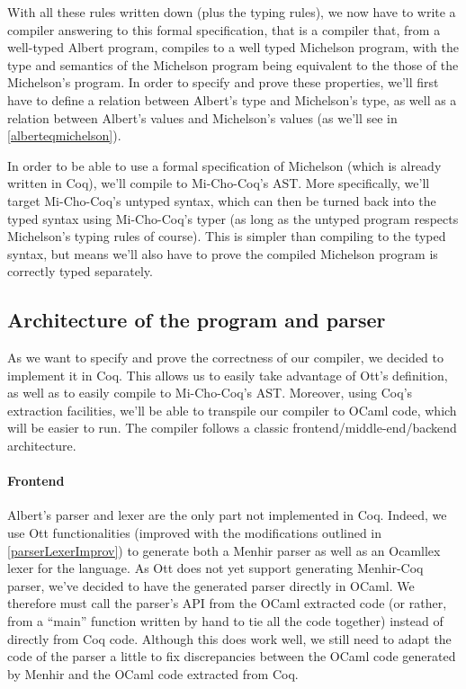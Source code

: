 \documentclass{report}
\begin{document}
With all these rules written down (plus the typing rules), we now have to write a compiler answering to this formal specification, that is a compiler that, from a well-typed Albert program, compiles to a well typed Michelson program, with the type and semantics of the Michelson program being equivalent to the those of the Michelson's program. In order to specify and prove these properties, we'll first have to define a relation between Albert's type and Michelson's type, as well as a relation between Albert's values and Michelson's values (as we'll see in \ref{alberteqmichelson}).

In order to be able to use a formal specification of Michelson (which is already written in Coq), we'll compile to Mi-Cho-Coq's AST. More specifically, we'll target Mi-Cho-Coq's untyped syntax, which can then be turned back into the typed syntax using Mi-Cho-Coq's typer (as long as the untyped program respects Michelson's typing rules of course). This is simpler than compiling to the typed syntax, but means we'll also have to prove the compiled Michelson program is correctly typed separately.

\subsection{Architecture of the program and parser}

As we want to specify and prove the correctness of our compiler, we decided to implement it in Coq. This allows us to easily take advantage of Ott's definition, as well as to easily compile to Mi-Cho-Coq's AST. Moreover, using Coq's extraction facilities, we'll be able to transpile our compiler to OCaml code, which will be easier to run. The compiler follows a classic frontend/middle-end/backend architecture.

\paragraph{Frontend}

Albert's parser and lexer are the only part not implemented in Coq. Indeed, we use Ott functionalities (improved with the modifications outlined in \ref{parserLexerImprov}) to generate both a Menhir parser as well as an Ocamllex lexer for the language. As Ott does not yet support generating Menhir-Coq parser, we've decided to have the generated parser directly in OCaml. We therefore must call the parser's API from the OCaml extracted code (or rather, from a ``main'' function written by hand to tie all the code together) instead of directly from Coq code. Although this does work well, we still need to adapt the code of the parser a little to fix discrepancies between the OCaml code generated by Menhir and the OCaml code extracted from Coq.
\end{document}
